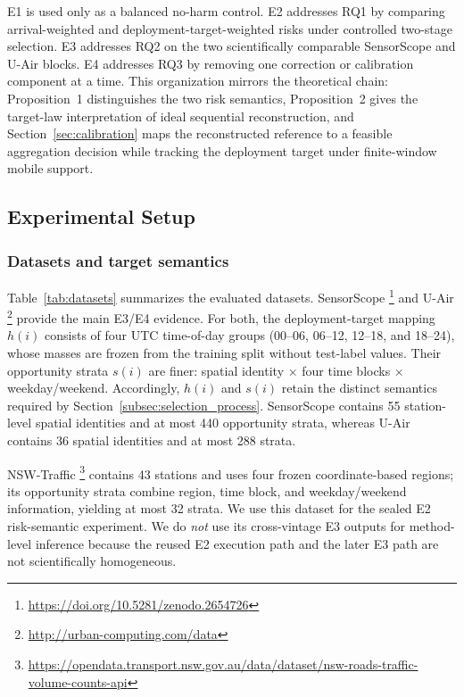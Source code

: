 \documentclass[letterpaper,journal]{IEEEtran}
\begin{document}
E1 is used only as a balanced no-harm control.  E2 addresses RQ1 by comparing
arrival-weighted and deployment-target-weighted risks under controlled
two-stage selection.  E3 addresses RQ2 on the two scientifically comparable
SensorScope and U-Air blocks.  E4 addresses RQ3 by removing one correction or
calibration component at a time.  This organization mirrors the theoretical
chain: Proposition~1 distinguishes the two risk semantics, Proposition~2 gives
the target-law interpretation of ideal sequential reconstruction, and
Section~\ref{sec:calibration} maps the reconstructed reference to a feasible
aggregation decision while tracking the deployment target under finite-window
mobile support.

\subsection{Experimental Setup}
\label{subsec:eval_setup}

\subsubsection{Datasets and target semantics}

Table~\ref{tab:datasets} summarizes the evaluated datasets.  SensorScope
\cite{ingelrest2010sensorscope,barrenetxea2019sensorscope}\footnote{\url{https://doi.org/10.5281/zenodo.2654726}}
and U-Air
\cite{zheng2013uair}\footnote{\url{http://urban-computing.com/data}}
provide the main E3/E4 evidence.  For both, the deployment-target mapping
$h(i)$ consists of four UTC time-of-day groups
(00--06, 06--12, 12--18, and 18--24), whose masses are frozen from the training
split without test-label values.  Their opportunity strata $s(i)$ are finer:
spatial identity $\times$ four time blocks $\times$ weekday/weekend.
Accordingly, $h(i)$ and $s(i)$ retain the distinct semantics required by
Section~\ref{subsec:selection_process}.  SensorScope contains 55 station-level
spatial identities and at most 440 opportunity strata, whereas U-Air contains
36 spatial identities and at most 288 strata.

NSW-Traffic
\cite{tfnsw2024traffic}\footnote{\url{https://opendata.transport.nsw.gov.au/data/dataset/nsw-roads-traffic-volume-counts-api}}
contains 43 stations and uses four frozen coordinate-based regions;
its opportunity strata combine region, time block, and weekday/weekend
information, yielding at most 32 strata.  We use this dataset for the sealed E2
risk-semantic experiment.  We do \emph{not} use its cross-vintage E3 outputs for
method-level inference because the reused E2 execution path and the later E3
path are not scientifically homogeneous.
\end{document}
